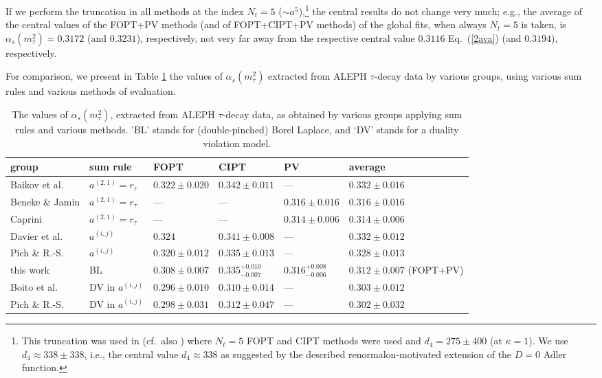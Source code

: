 \documentclass[aps,nofootinbib,showkeys,noshowpacs,preprintnumbers,amsmath,amssymb]{revtex4}
\begin{document}
If we perform the truncation in all methods at the index $N_t=5$ ($\sim a^5$),\footnote{This truncation was used in \cite{Pich} (cf.~also \cite{Pich3,Pich4}) where $N_t=5$ FOPT and CIPT methods were used and $d_4 = 275 \pm 400$ (at $\kappa=1$). We use $d_4 \approx 338 \pm 338$, i.e., the central value $d_4 \approx 338$ as suggested by the described renormalon-motivated extension of the $D=0$ Adler function.} the central results do not change very much; e.g., the average of the central values of the FOPT+PV methods (and of FOPT+CIPT+PV methods) of the global fits, when always $N_t=5$ is taken, is $\alpha_s(m_{\tau}^2)=0.3172$ (and $0.3231$), respectively, not very far away from the respective central value $0.3116$ Eq.~(\ref{2ava}) (and $0.3194$), respectively.

For comparison, we present in Table \ref{tabreslit} the values of $\alpha_s(m_{\tau}^2)$ extracted from ALEPH $\tau$-decay data by various groups, using various sum rules and various methods of evaluation.
\begin{table}
  \caption{The values of $\alpha_s(m_{\tau}^2)$, extracted from ALEPH $\tau$-decay data, as obtained by various groups applying  sum rules and various methods. 'BL' stands for (double-pinched) Borel Laplace, and `DV' stands for a duality violation model.}
 \label{tabreslit}
\begin{ruledtabular}
\begin{tabular}{l|l|lll|l}
group &  sum rule & FOPT & CIPT & PV & average \\
\hline
Baikov et al.~\cite{BCK} & $a^{(2,1)}=r_{\tau}$ & $0.322 \pm 0.020$ & $0.342 \pm 0.011$ & --- & $0.332 \pm 0.016$ \\
Beneke \& Jamin \cite{BJ} & $a^{(2,1)}=r_{\tau}$ &  --- & --- & $0.316 \pm 0.016$ & $0.316 \pm 0.016$ \\
Caprini \cite{Caprini2020} & $a^{(2,1)}=r_{\tau}$ &  --- & --- & $0.314 \pm 0.006$ &  $0.314 \pm 0.006$ \\
Davier et al.~\cite{Davetal} & $a^{(i,j)}$ & $0.324$ & $0.341 \pm 0.008$ & --- & $0.332 \pm 0.012$ \\
Pich \& R.-S.~\cite{Pich}   &  $a^{(i,j)}$     & $0.320 \pm 0.012$ &  $0.335 \pm 0.013$ & --- & $0.328 \pm 0.013$  \\
this work  & BL & $0.308 \pm 0.007$ & $0.335^{+0.010}_{-0.007}$ & $0.316^{+0.008}_{-0.006}$ & $0.312 \pm 0.007$ (FOPT+PV) \\
Boito et al.~\cite{Bo2015} & DV in $a^{(i,j)}$ & $0.296 \pm 0.010$ & $0.310 \pm 0.014$ & --- & $0.303 \pm 0.012$ \\
Pich \& R.-S.~\cite{Pich}   &   DV in $a^{(i,j)}$ & $0.298 \pm 0.031$ & $0.312 \pm 0.047$ & --- & $0.302 \pm 0.032$ 
\end{tabular}
\end{ruledtabular}
\end{table}
\end{document}
